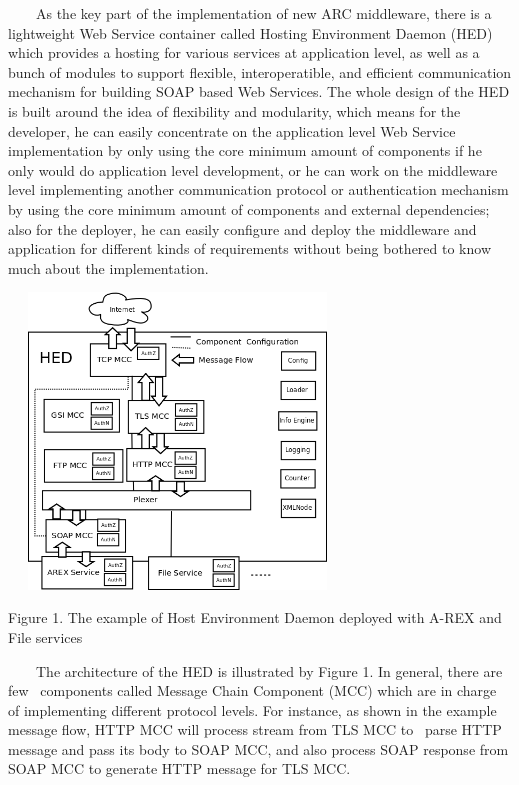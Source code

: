 \documentclass{article}
\begin{document}
\ \ \ \ As the key part of the implementation of new ARC middleware,
there is a lightweight Web Service container called Hosting Environment
Daemon (HED) which provides a hosting for various services at
application level, as well as a bunch of modules to support flexible,
interoperatible, and efficient communication mechanism for building
SOAP based Web Services. The whole design of the HED is built around
the idea of flexibility and modularity, which means for the developer,
he can easily concentrate on the application level Web Service
implementation by only using the core minimum amount of components if
he only would do application level development, or he can work on the
middleware level implementing another communication protocol or
authentication mechanism by using the core minimum amount of components
and external dependencies; also for the deployer, he can easily
configure and deploy the middleware and application for different kinds
of requirements without being bothered to know much about the
implementation.



\begin{center}
\includegraphics[width=3.528in,height=3.098in]{Secpaper-img1.png}
\end{center}

\bigskip

{\centering
Figure 1. The example of Host Environment Daemon deployed with A-REX and
File services
\par}

\ \ \ \ The architecture of the HED is illustrated by Figure 1. In
general, there are few \ components called Message Chain Component
(MCC) which are in charge of implementing different protocol levels.
For instance, as shown in the example message flow, HTTP MCC will
process stream from TLS MCC to \ parse HTTP message and pass its body
to SOAP MCC, and also process SOAP response from SOAP MCC to generate
HTTP message for TLS MCC.
\end{document}
